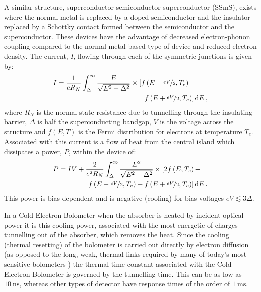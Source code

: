 \documentclass[aip, apl, a4paper, amsmath,amssymb, reprint]{revtex4-1}
\begin{document}
A similar structure, superconductor-semiconductor-superconductor (SSmS), exists where the normal metal is replaced by a doped semiconductor and the insulator replaced by a Schottky contact formed between the semiconductor and the superconductor\cite{Savin01}. These devices have the advantage of decreased electron-phonon coupling compared to the normal metal based type of device\cite{Prest11} and reduced electron density. The current, $I$, flowing through each of the symmetric junctions is given by:
\begin{align}
I &=\frac{1}{eR_{N}}\int_{\Delta}^{\infty} \frac{E}{\sqrt{E^{2}-\Delta^{2}}}  \times \left[f\left(E-\nicefrac{eV}{2},T_{e}\right) - \right. \nonumber \\
&\qquad \qquad \qquad \qquad \qquad \qquad  \; \left. f\left(E+\nicefrac{eV}{2},T_{e}\right)\right] \mathrm{d}E\, , \label{eq:IV}
\end{align}
where $R_{N}$ is the normal-state resistance due to tunnelling through the insulating barrier, $\Delta$ is half the superconducting bandgap, $V$ is the  voltage across the structure and  $f\left(E,T\right)$ is the Fermi distribution for electrons at temperature $T_{e}$. Associated with this current is a flow of heat from the central island which dissipates a power, $P$, within the device of:
\begin{align}
P &= IV + \frac{2}{e^{2}R_{N}}\int_{\Delta}^{\infty} \frac{E^{2}}{\sqrt{E^{2}-\Delta^{2}}} \times \left[2f\left(E,T_{s}\right) - \right. \nonumber \\ 
&\qquad \qquad  \left. f\left(E-\nicefrac{eV}{2},T_{e}\right)- f\left(E+\nicefrac{eV}{2}, T_{e}\right)\right] \mathrm{d}E\, \label{eqn:Pc}.
\end{align}
This power is bias dependent and is negative (cooling) for bias voltages $eV \lesssim 3\Delta$.

In a Cold Electron Bolometer when the absorber is heated by incident optical power it is this cooling power, associated with the most energetic of charges tunnelling out of the absorber, which removes the heat. Since the cooling (thermal resetting) of the bolometer is carried out directly by electron diffusion (as opposed to the long, weak, thermal links required by many of today's most sensitive bolometers \cite{Mauskopf97, Audley12, Holland13}) the thermal time constant associated with the Cold Electron Bolometer is governed by the tunnelling time. This can be \cite{Kuzmin04} as low as $10~\mathrm{ns}$, whereas other types of detector \cite{Jackson12} have response times of the order of $1~\mathrm{ms}$.
\end{document}
